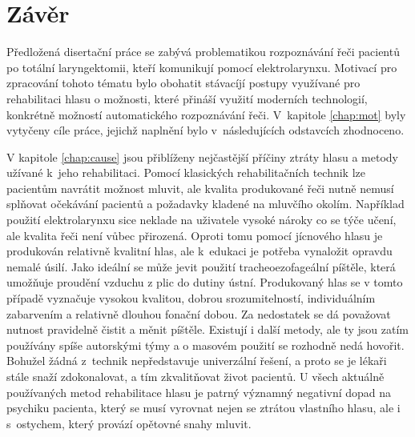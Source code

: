 \ifdefined\CELE
\else

\fi

\chapter*{Závěr}
\label{chap:conclusion}

Předložená disertační práce se zabývá problematikou rozpoznávání řeči pacientů po totální laryngektomii, kteří komunikují pomocí elektrolarynxu. Motivací pro zpracování tohoto tématu bylo obohatit stávacíjí postupy využívané pro rehabilitaci hlasu o možnosti, které přináší využití moderních technologií, konkrétně možností automatického rozpoznávání řeči. V~kapitole \ref{chap:mot} byly vytyčeny cíle práce, jejichž naplnění bylo v~následujících odstavcích zhodnoceno.

V kapitole \ref{chap:cause} jsou přiblíženy nejčastější příčiny ztráty hlasu a metody užívané k~jeho rehabilitaci.
Pomocí klasických rehabilitačních technik lze pacientům navrátit možnost mluvit, ale kvalita produkované řeči nutně nemusí splňovat očekávání pacientů  a požadavky kladené na mluvčího okolím. Například použití
elektrolarynxu sice neklade na uživatele vysoké nároky co se týče učení, ale
kvalita řeči není vůbec přirozená. Oproti tomu pomocí jícnového hlasu je
produkován relativně kvalitní hlas, ale k~edukaci je potřeba vynaložit opravdu
nemalé úsilí. Jako ideální se může jevit použití tracheoezofageální píštěle,
která umožňuje proudění vzduchu z plic do dutiny ústní. Produkovaný hlas se v
tomto případě vyznačuje vysokou kvalitou, dobrou srozumitelností,
individuálním zabarvením a relativně dlouhou fonační dobou. Za nedostatek se
dá považovat nutnost pravidelně čistit a měnit píštěle. Existují i další
metody,
ale ty jsou zatím používány
spíše autorskými týmy a o masovém použití se rozhodně nedá hovořit. Bohužel
žádná z~technik nepředstavuje univerzální řešení, a proto se je lékaři
stále snaží zdokonalovat, a tím zkvalitňovat život pacientů. U všech aktuálně používaných metod rehabilitace hlasu
je patrný významný negativní dopad na psychiku pacienta, který se musí vyrovnat nejen se ztrátou vlastního hlasu, ale i s~ostychem, který provází opětovné snahy mluvit.

